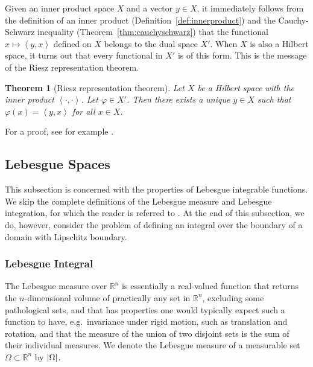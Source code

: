 \documentclass[english, 12pt, a4paper, sci, utf8, a-2b, online]{aaltothesis}
\theoremstyle{definition}
\theoremstyle{plain}
\newtheorem{theorem}{Theorem}[section]
\DeclarePairedDelimiter\abs{\lvert}{\rvert}
\newcommand*{\innerprod}[2]{\left\langle #1, #2 \right\rangle}
\numberwithin{equation}{section}
\begin{document}
Given an inner product space $X$ and a vector $y \in X$,
it immediately follows from the definition
of an inner product (Definition~\ref{def:innerproduct})
and the Cauchy-Schwarz inequality (Theorem~\ref{thm:cauchyschwarz})
that the functional $x \mapsto \innerprod{y}{x}$ defined on $X$
belongs to the dual space $X'$. When $X$ is also a Hilbert space,
it turns out that every functional in $X'$ is of this form.
This is the message of the Riesz representation theorem.
\begin{theorem}[Riesz representation theorem]
    \label{thm:rieszrepresentationtheorem}
    Let $X$ be a Hilbert space with the inner product $\innerprod{\cdot}{\cdot}$.
    Let $\varphi \in X'$. Then there exists a unique $y \in X$ such that
    $\varphi(x) = \innerprod{y}{x}$ for all $x \in X$.
\end{theorem}
For a proof, see for example \cite[Theorem~4.12 on p.~81]{rudin1986}.

\subsection{Lebesgue Spaces}
\label{subsec:lebesguespaces}

This subsection is concerned with the properties of Lebesgue integrable functions.
We skip the complete definitions of the Lebesgue measure and Lebesgue integration,
for which the reader is referred to \cite{folland1999}.
At the end of this subsection, we do, however, consider the problem of defining
an integral over the boundary of a domain with Lipschitz boundary.

\subsubsection{Lebesgue Integral}
\label{subsubsec:lebesgueintegral}

The Lebesgue measure over $\mathbb{R}^n$ is essentially a real-valued function
that returns the $n$-dimensional volume of practically any set in $\mathbb{R}^n$,
excluding some pathological sets, and that has properties one would typically
expect such a function to have, e.g.\
invariance under rigid motion, such as translation and rotation,
and that the measure of the union of two disjoint
sets is the sum of their individual measures. We denote the Lebesgue measure
of a measurable set $\Omega \subset \mathbb{R}^n$ by $\abs{\Omega}$.
\end{document}

